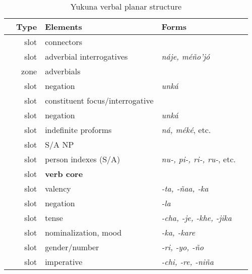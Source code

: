 \documentclass[output=paper]{langscibook}
\begin{document}
\begin{table}
    \caption{Yukuna verbal planar structure }
    \label{tab:yuk:template}
\begin{tabular}{Srlll} \lsptoprule
	    & Type  & Elements  & Forms \\ 
	\midrule
\label{yuk:con}                & slot          & connectors                        & \textit{}                  \\
\label{advint}                & slot          & adverbial interrogatives                   & \textit{náje, méño'jó} \\
\label{adv}               & zone          & adverbials              & \textit{}             \\
\label{neg1}               & slot          & negation             & \textit{unká}     \\
\label{yuk:foc}             & slot          & constituent focus/interrogative            & \textit{}          \\
\label{neg2}                 & slot          & negation               & \textit{unká}               \\
\label{indf}                & slot          & indefinite proforms & \textit{ná, méké}, etc. \\
\label{SA}               & slot          & S/A    NP                & \textit{}      \\
\label{index}                & slot          & person indexes (S/A)              & \textit{nu-, pi-, ri-, ru-}, etc.              \\
\textbf{\label{yuk:core}}              & slot          & \textbf{verb core}                   & \textit{}              \\
\label{val}     & slot          & valency           & \textit{-ta, -ñaa, -ka}                  \\
\label{neg3}              & slot          & negation              & \textit{-la}                  \\
\label{yuk:tense}              & slot          & tense                        & \textit{-cha, -je, -khe, -jika}                \\
\label{ka}               & slot          & nominalization, mood      & \textit{-ka, -kare} \\
\label{gn}               & slot          & gender/number                     & \textit{-ri, -yo, -ño}             \\
\label{imp}               & slot          & imperative                     & \textit{-chi, -re, -niña}                \\

\end{tabular}
\end{table}
\end{document}
